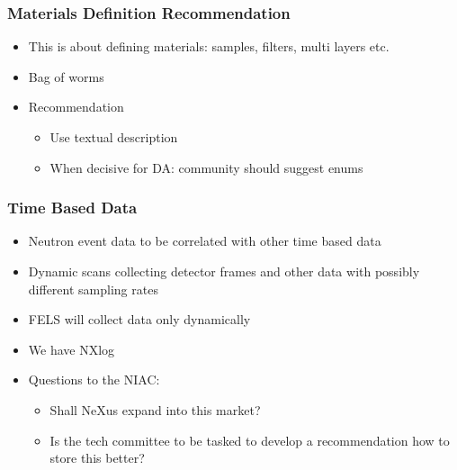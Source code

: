 \documentclass{beamer}
\begin{document}
\begin{frame}
\frametitle{Materials Definition Recommendation}
\begin{itemize}
\item This is about defining materials: samples, filters, multi layers etc. 
\item Bag of worms
\item Recommendation
\begin{itemize}
\item Use textual description
\item When decisive for DA: community should suggest enums
\end{itemize}
\end{itemize}
\end{frame}

\begin{frame}
\frametitle{Time Based Data}
\begin{itemize}
\item Neutron event data to be correlated with other time based data
\item Dynamic scans collecting detector frames and other data with possibly 
  different sampling rates
\item FELS will collect data only dynamically
\item We have NXlog
\item Questions to the NIAC:
\begin{itemize}
\item Shall NeXus expand into this market?
\item Is the tech committee to be tasked to develop a recommendation how to store this 
  better?
\end{itemize}
\end{itemize}
\end{frame}
\end{document}
